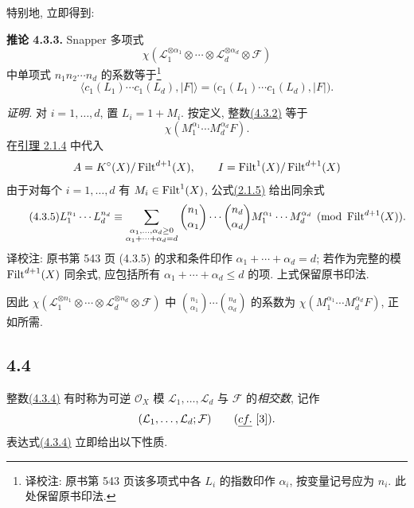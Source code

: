 特别地, 立即得到:

\textbf{推论 4.3.3.} Snapper 多项式
%
\[
\chi(\mathcal L_1^{\otimes\alpha_1}\otimes\cdots\otimes
\mathcal L_d^{\otimes\alpha_d}\otimes\mathcal F)
\]
中单项式 $n_1n_2\cdots n_d$ 的系数等于\footnote{译校注: 原书第 543 页该多项式中各 $L_i$ 的指数印作 $\alpha_i$, 按变量记号应为 $n_i$. 此处保留原书印法.}
\begin{equation}\tag{4.3.4}
\bigl\langle c_1(L_1)\cdots c_1(L_d),\lvert F\rvert\bigr\rangle
=\bigl(c_1(L_1)\cdots c_1(L_d),\lvert F\rvert\bigr).
\end{equation}

\emph{证明.} 对 $i=1,\ldots,d$, 置 $L_i=1+M_i$. 按定义, 整数\hyperlink{sga6.e10.eq.4-3-2}{(4.3.2)} 等于
%
%
\[
\chi(M_1^{\alpha_1}\cdots M_d^{\alpha_d}F).
\]
在\hyperlink{sga6.e10.lem.2-1-4}{引理 2.1.4} 中代入
\[
A=K^\circ(X)/\operatorname{Filt}^{d+1}(X),
\qquad I=\operatorname{Filt}^1(X)/\operatorname{Filt}^{d+1}(X)
\]
由于对每个 $i=1,\ldots,d$ 有 $M_i\in\operatorname{Filt}^1(X)$, 公式\hyperlink{sga6.e10.eq.2-1-5}{(2.1.5)} 给出同余式
%
\begin{equation}\tag{4.3.5}
L_1^{n_1}\cdots L_d^{n_d}\equiv
\sum_{\substack{\alpha_1,\ldots,\alpha_d\geq0\\
\alpha_1+\cdots+\alpha_d=d}}
\binom{n_1}{\alpha_1}\cdots\binom{n_d}{\alpha_d}
M_1^{\alpha_1}\cdots M_d^{\alpha_d}
\pmod{\operatorname{Filt}^{d+1}(X)}.
\end{equation}
译校注: 原书第 543 页 (4.3.5) 的求和条件印作 $\alpha_1+\cdots+\alpha_d=d$; 若作为完整的模 $\operatorname{Filt}^{d+1}(X)$ 同余式, 应包括所有 $\alpha_1+\cdots+\alpha_d\leq d$ 的项. 上式保留原书印法.

因此 $\chi(\mathcal L_1^{\otimes n_1}\otimes\cdots\otimes \mathcal L_d^{\otimes n_d}\otimes\mathcal F)$ 中 $\binom{n_1}{\alpha_1}\cdots\binom{n_d}{\alpha_d}$ 的系数为 $\chi(M_1^{\alpha_1}\cdots M_d^{\alpha_d}F)$, 正如所需.
%
%
%
%

\subsection*{4.4} 整数\hyperlink{sga6.e10.eq.4-3-4}{(4.3.4)} 有时称为可逆 $\mathcal O_X$ 模 $\mathcal L_1,\ldots,\mathcal L_d$ 与 $\mathcal F$ 的\emph{相交数}, 记作
%
%
%
\[
(\mathcal L_1,\ldots,\mathcal L_d;\mathcal F)
\qquad(\emph{cf.}~[3]).
\]
表达式\hyperlink{sga6.e10.eq.4-3-4}{(4.3.4)} 立即给出以下性质.

